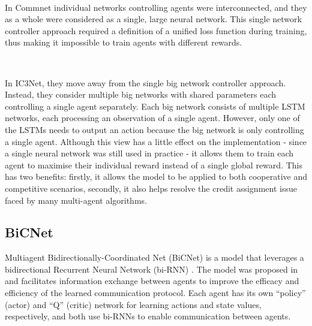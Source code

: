 \documentclass{article}
\begin{document}
\

In Commnet \citep{sukhbaatar2016commnet} individual networks controlling agents were interconnected, and they as a whole were considered as a single, large neural network. This single network controller approach required a definition of a unified loss function during training, thus making it impossible to train agents with different rewards. 

\

In IC3Net, they move away from the single big network controller approach. Instead, they consider multiple big networks with shared parameters each controlling a single agent separately. Each big network consists of multiple LSTM networks, each processing an observation of a single agent. However, only one of the LSTMs needs to output an action because the big network is only controlling a single agent. Although this view has a little effect on the implementation - since a single neural network was still used in practice - it allows them to train each agent to maximise their individual reward instead of a single global reward. This has two benefits: firstly, it allows the model to be applied to both cooperative and competitive scenarios, secondly, it also helps resolve the credit assignment issue faced by many multi-agent algorithms. 

\subsection{BiCNet}

Multiagent Bidirectionally-Coordinated Net (BiCNet) is a model that leverages a bidirectional Recurrent Neural Network (bi-RNN) \citep{chuster1997Bidirectional}. The model was proposed in \citet{peng2017bicnet} and facilitates information exchange between agents to improve the efficacy and efficiency of the learned communication protocol. Each agent has its own ``policy'' (actor) and ``Q'' (critic) network for learning actions and state values, respectively, and both use bi-RNNs to enable communication between agents.

\
\end{document}
